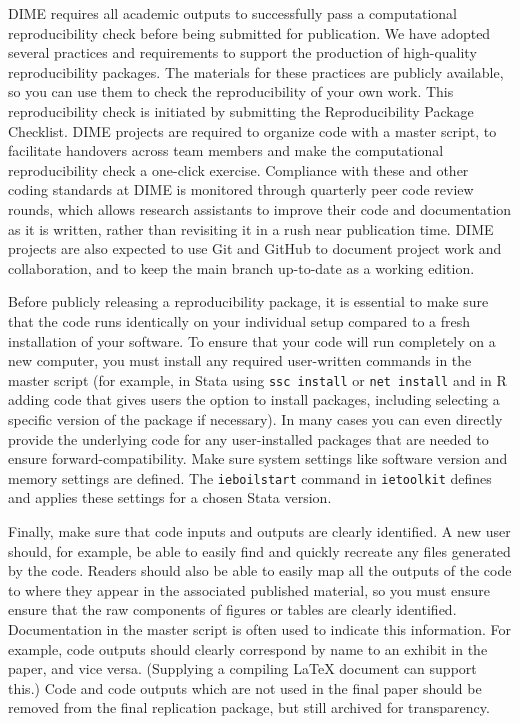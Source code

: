 DIME requires all academic outputs to successfully pass a computational reproducibility check
before being submitted for publication.
We have adopted several practices and requirements to support the production
of high-quality reproducibility packages.
The materials for these practices are publicly available,
so you can use them to check the reproducibility of your own work.
This reproducibility check is initiated by submitting the Reproducibility Package Checklist.
DIME projects are required to organize code
with a master script, to facilitate handovers across team members
and make the computational reproducibility check a one-click exercise.
Compliance with these and other coding standards at DIME is monitored through
quarterly peer code review rounds, which allows research assistants to improve their code and documentation as it is written,
rather than revisiting it in a rush near publication time.
DIME projects are also expected to use Git and GitHub
to document project work and collaboration,
and to keep the main branch up-to-date as a working edition.

Before publicly releasing a reproducibility package,
it is essential to make sure that the code runs identically
on your individual setup compared to
a fresh installation of your software.
To ensure that your code will run completely on a new computer,
you must install any required user-written commands in the master script
(for example, in Stata using \texttt{ssc install} or \texttt{net install}
and in R adding code that gives users the option to install packages,
including selecting a specific version of the package if necessary).
In many cases you can even directly provide the underlying code
for any user-installed packages that are needed to ensure forward-compatibility.
Make sure system settings like software version and memory settings are defined.
The \texttt{ieboilstart} command in \texttt{ietoolkit} defines and applies these settings
for a chosen Stata version.

Finally, make sure that code inputs and outputs are clearly identified.
A new user should, for example, be able to easily find and quickly recreate
any files generated by the code.
Readers should also be able to easily map all the outputs of the code
to where they appear in the associated published material,
so you must ensure ensure that the raw components of figures or tables are clearly identified.
Documentation in the master script is often used to indicate this information.
For example, code outputs should clearly correspond by name to an exhibit in the paper, and vice versa.
(Supplying a compiling {\LaTeX} document can support this.)
Code and code outputs which are not used in the final paper should be removed from the final replication package,
but still archived for transparency.


